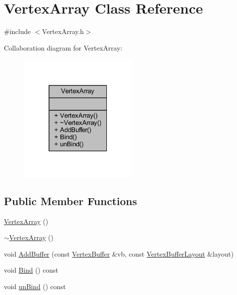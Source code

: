 \hypertarget{class_vertex_array}{}\section{Vertex\+Array Class Reference}
\label{class_vertex_array}


{\ttfamily \#include $<$Vertex\+Array.\+h$>$}



Collaboration diagram for Vertex\+Array\+:
\nopagebreak
\begin{figure}[H]
\begin{center}
\leavevmode
\includegraphics[width=169pt]{class_vertex_array__coll__graph}
\end{center}
\end{figure}
\subsection*{Public Member Functions}
\begin{DoxyCompactItemize}
\item 
\mbox{\hyperlink{class_vertex_array_ab8a2dcce9698f96dac5f9a19c6979d03}{Vertex\+Array}} ()
\item 
\mbox{\hyperlink{class_vertex_array_a82597eb9daba5ad66dd3cf898e159a95}{$\sim$\+Vertex\+Array}} ()
\item 
void \mbox{\hyperlink{class_vertex_array_a994a9dc780ecc0c725b0814a9e7ab532}{Add\+Buffer}} (const \mbox{\hyperlink{class_vertex_buffer}{Vertex\+Buffer}} \&vb, const \mbox{\hyperlink{class_vertex_buffer_layout}{Vertex\+Buffer\+Layout}} \&layout)
\item 
void \mbox{\hyperlink{class_vertex_array_ad5059455f0864327028636c628d5a661}{Bind}} () const
\item 
void \mbox{\hyperlink{class_vertex_array_a70bf6308f19780c3099a8351c29ae4ff}{un\+Bind}} () const
\end{DoxyCompactItemize}


